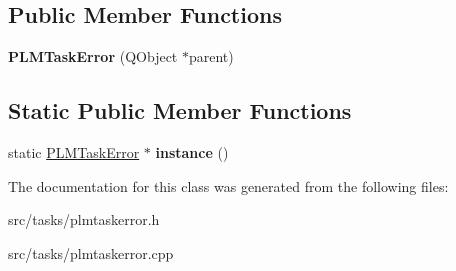 \subsection*{Public Member Functions}
\begin{DoxyCompactItemize}
\item 
{\bfseries P\+L\+M\+Task\+Error} (Q\+Object $\ast$parent)\hypertarget{class_p_l_m_task_error_a4fd8fe77d074d6f8fa5d1595442d5a79}{}\label{class_p_l_m_task_error_a4fd8fe77d074d6f8fa5d1595442d5a79}

\end{DoxyCompactItemize}
\subsection*{Static Public Member Functions}
\begin{DoxyCompactItemize}
\item 
static \hyperlink{class_p_l_m_task_error}{P\+L\+M\+Task\+Error} $\ast$ {\bfseries instance} ()\hypertarget{class_p_l_m_task_error_a9e4a0fa94c692b736c2a31be19f413ba}{}\label{class_p_l_m_task_error_a9e4a0fa94c692b736c2a31be19f413ba}

\end{DoxyCompactItemize}


The documentation for this class was generated from the following files\+:\begin{DoxyCompactItemize}
\item 
src/tasks/plmtaskerror.\+h\item 
src/tasks/plmtaskerror.\+cpp\end{DoxyCompactItemize}
